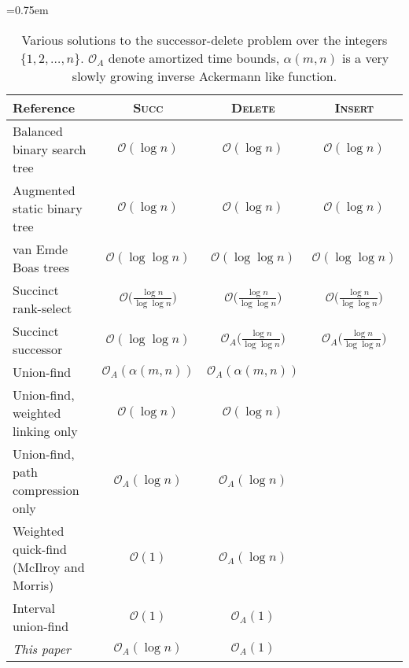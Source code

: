 \documentclass[a4paper]{lipics-v2021}
\newcommand{\Oh}{\mathcal{O}}
\newcommand{\FuncName}[1]{\textup{\textsc{#1}}}
\newcommand{\Delete}{\FuncName{Delete}}
\newcommand{\Insert}{\FuncName{Insert}}
\newcommand{\Succ}{\FuncName{Succ}}
\begin{document}
\begin{table}
  \caption{Various solutions to the successor-delete problem over the integers $\{1,2,\ldots,n\}$. $\Oh_A$ denote amortized time bounds, $\alpha(m, n)$ is a very slowly growing inverse Ackermann like function.}
  \label{tab:results}

  \centering
  \tabcolsep=0.75em
  \begin{tabular}{lccc}
    Reference & \Succ & \Delete & \Insert \\
    \hline
    Balanced binary search tree~\cite{AVL62,GuibasSedgewick78} & $\Oh(\log n)$ & $\Oh(\log n)$ & $\Oh(\log n)$ \\
    Augmented static binary tree & $\Oh(\log n)$ & $\Oh(\log n)$ & $\Oh(\log n)$ \\
    van Emde Boas trees~\cite{Boas77,BoasKaasZijlstra77} & $\Oh(\log\log n)$ & $\Oh(\log\log n)$ & $\Oh(\log\log n)$ \\
    Succinct rank-select~\cite{LiLiangYuZhou23} & $\Oh\bigl(\frac{\log n}{\log\log n}\bigr)$ & $\Oh\bigl(\frac{\log n}{\log\log n}\bigr)$ & $\Oh\bigl(\frac{\log n}{\log\log n}\bigr)$ \\
    Succinct successor~\cite{PibiriVenturini17} & $\Oh(\log\log n)$ & $\Oh_A\bigl(\frac{\log n}{\log\log n}\bigr)$ & $\Oh_A\bigl(\frac{\log n}{\log\log n}\bigr)$ \\
    Union-find~\cite{Tarjan75} & $\Oh_A(\alpha(m, n))$ & $\Oh_A(\alpha(m, n))$ \\
    Union-find, weighted linking only~\cite{Fischer72} & $\Oh(\log n)$ & $\Oh(\log n)$ \\
    Union-find, path compression only~\cite{TarjanLeeuwen84} & $\Oh_A(\log n)$ & $\Oh_A(\log n)$ \\
    Weighted quick-find (McIlroy and Morris) & $\Oh(1)$ & $\Oh_A(\log n)$ & \\
    Interval union-find~\cite{GabowTarjan85} & $\Oh(1)$ & $\Oh_A(1)$ & \\
    \emph{This paper} & $\Oh_A(\log n)$ & $\Oh_A(1)$ \\
    \hline
  \end{tabular}
\end{table}
\end{document}

